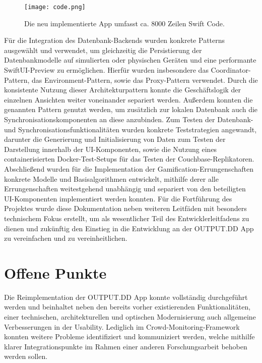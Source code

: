 \begin{figure}[H]
\texttt{[image: code.png]}
\caption{Die neu implementierte App umfasst ca. 8000 Zeilen Swift Code.}\label{fig:code}
\end{figure}

\noindent Für die Integration des Datenbank-Backends wurden konkrete Patterns ausgewählt und verwendet, um gleichzeitig die Persistierung der Datenbankmodelle auf simulierten oder physischen Geräten und eine performante SwiftUI-Preview zu ermöglichen. Hierfür wurden insbesondere das Coordinator-Pattern, das Environment-Pattern, sowie das Proxy-Pattern verwendet. Durch die konsistente Nutzung dieser Architekturpattern konnte die Geschäftslogik der einzelnen Ansichten weiter voneinander separiert werden. Außerdem konnten die genannten Pattern genutzt werden, um zusätzlich zur lokalen Datenbank auch die Synchronisationskomponenten an diese anzubinden. Zum Testen der Datenbank- und Synchronisationsfunktionalitäten wurden konkrete Teststrategien angewandt, darunter die Generierung und Initialisierung von Daten zum Testen der Darstellung innerhalb der UI-Komponenten, sowie die Nutzung eines containerisierten Docker-Test-Setups für das Testen der Couchbase-Replikatoren. Abschließend wurden für die Implementation der Gamification-Errungenschaften konkrete Modelle und Basisalgorithmen entwickelt, mithilfe derer alle Errungenschaften weitestgehend unabhängig und separiert von den beteiligten UI-Komponenten implementiert werden konnten. Für die Fortführung des Projektes wurde diese Dokumentation neben weiteren Leitfäden mit besonders technischem Fokus erstellt, um als wesentlicher Teil des Entwicklerleitfadens zu dienen und zukünftig den Einstieg in die Entwicklung an der OUTPUT.DD App zu vereinfachen und zu vereinheitlichen.

\section{Offene Punkte}

Die Reimplementation der OUTPUT.DD App konnte vollständig durchgeführt werden und beinhaltet neben den bereits vorher existierenden Funktionalitäten, einer technischen, architekturellen und optischen Modernisierung auch allgemeine Verbesserungen in der Usability. Lediglich im Crowd-Monitoring-Framework konnten weitere Probleme identifiziert und kommuniziert werden, welche mithilfe klarer Integrationspunkte im Rahmen einer anderen Forschungsarbeit behoben werden sollen.


